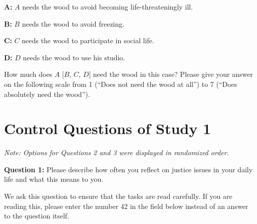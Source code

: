\documentclass[egregdoesnotlikesansseriftitles]{scrartcl}
\begin{document}
\noindent\textbf{A:} $A$ needs the wood to avoid becoming life-threateningly ill.\vspace{2ex} %

\noindent\textbf{B:} $B$ needs the wood to avoid freezing.\vspace{2ex} %

\noindent\textbf{C:} $C$ needs the wood to participate in social life.\vspace{2ex} %

\noindent\textbf{D:} $D$ needs the wood to use his studio.\vspace{2ex} %

\noindent How much does $A$ $[B$, $C$, $D]$ need the wood in this case? %
Please give your answer on the following scale from 1 (``Does not need the wood at all'') to 7 (``Does absolutely need the wood''). %


\clearpage
\section{Control Questions of Study 1}\label{sec:app_study_1_questions}
\noindent\textit{Note: Options for Questions 2 and 3 were displayed in randomized order.}\vspace{2ex}

\noindent\textbf{Question 1:} Please describe how often you reflect on justice issues in your daily life and what this means to you. %

We ask this question to ensure that the tasks are read carefully. %
If you are reading this, please enter the number 42 in the field below instead of an answer to the question itself. %
\end{document}
